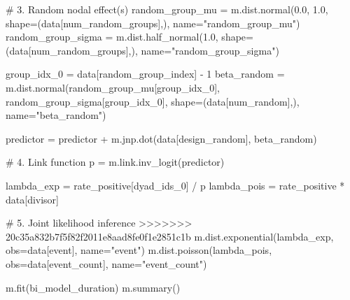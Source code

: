 \documentclass[
  letterpaper,
  DIV=11,
  numbers=noendperiod]{scrartcl}
\newenvironment{Shaded}{\begin{snugshade}}{\end{snugshade}}
\newcommand{\CommentTok}[1]{\textcolor[rgb]{0.37,0.37,0.37}{#1}}
\newcommand{\DecValTok}[1]{\textcolor[rgb]{0.68,0.00,0.00}{#1}}
\newcommand{\ErrorTok}[1]{\textcolor[rgb]{0.68,0.00,0.00}{#1}}
\newcommand{\FloatTok}[1]{\textcolor[rgb]{0.68,0.00,0.00}{#1}}
\newcommand{\NormalTok}[1]{\textcolor[rgb]{0.00,0.23,0.31}{#1}}
\newcommand{\OperatorTok}[1]{\textcolor[rgb]{0.37,0.37,0.37}{#1}}
\newcommand{\StringTok}[1]{\textcolor[rgb]{0.13,0.47,0.30}{#1}}
\begin{document}
\begin{Shaded}
\begin{Highlighting}[]
    \CommentTok{\# 3. Random nodal effect(s)}
\NormalTok{    random\_group\_mu }\OperatorTok{=}\NormalTok{ m.dist.normal(}\FloatTok{0.0}\NormalTok{, }\FloatTok{1.0}\NormalTok{, shape}\OperatorTok{=}\NormalTok{(data[}\StringTok{\textquotesingle{}num\_random\_groups\textquotesingle{}}\NormalTok{],), name}\OperatorTok{=}\StringTok{"random\_group\_mu"}\NormalTok{)}
\NormalTok{    random\_group\_sigma }\OperatorTok{=}\NormalTok{ m.dist.half\_normal(}\FloatTok{1.0}\NormalTok{, shape}\OperatorTok{=}\NormalTok{(data[}\StringTok{\textquotesingle{}num\_random\_groups\textquotesingle{}}\NormalTok{],), name}\OperatorTok{=}\StringTok{"random\_group\_sigma"}\NormalTok{)}
    
\NormalTok{    group\_idx\_0 }\OperatorTok{=}\NormalTok{ data[}\StringTok{\textquotesingle{}random\_group\_index\textquotesingle{}}\NormalTok{] }\OperatorTok{{-}} \DecValTok{1}
\NormalTok{    beta\_random }\OperatorTok{=}\NormalTok{ m.dist.normal(random\_group\_mu[group\_idx\_0], random\_group\_sigma[group\_idx\_0], shape}\OperatorTok{=}\NormalTok{(data[}\StringTok{\textquotesingle{}num\_random\textquotesingle{}}\NormalTok{],), name}\OperatorTok{=}\StringTok{"beta\_random"}\NormalTok{)}
    
\NormalTok{    predictor }\OperatorTok{=}\NormalTok{ predictor }\OperatorTok{+}\NormalTok{ m.jnp.dot(data[}\StringTok{\textquotesingle{}design\_random\textquotesingle{}}\NormalTok{], beta\_random)}

    \CommentTok{\# 4. Link function}
\NormalTok{    p }\OperatorTok{=}\NormalTok{ m.link.inv\_logit(predictor)}
    
\NormalTok{    lambda\_exp }\OperatorTok{=}\NormalTok{ rate\_positive[dyad\_ids\_0] }\OperatorTok{/}\NormalTok{ p}
\NormalTok{    lambda\_pois }\OperatorTok{=}\NormalTok{ rate\_positive }\OperatorTok{*}\NormalTok{ data[}\StringTok{\textquotesingle{}divisor\textquotesingle{}}\NormalTok{]}
    
    \CommentTok{\# 5. Joint likelihood inference}
\OperatorTok{\textgreater{}\textgreater{}\textgreater{}\textgreater{}\textgreater{}\textgreater{}\textgreater{}} \DecValTok{20}\ErrorTok{c35a832b7f5f82f2011e8aad8fe0f1e2851c1b}
\NormalTok{    m.dist.exponential(lambda\_exp, obs}\OperatorTok{=}\NormalTok{data[}\StringTok{\textquotesingle{}event\textquotesingle{}}\NormalTok{], name}\OperatorTok{=}\StringTok{"event"}\NormalTok{)}
\NormalTok{    m.dist.poisson(lambda\_pois, obs}\OperatorTok{=}\NormalTok{data[}\StringTok{\textquotesingle{}event\_count\textquotesingle{}}\NormalTok{], name}\OperatorTok{=}\StringTok{"event\_count"}\NormalTok{)}

\NormalTok{m.fit(bi\_model\_duration)}
\NormalTok{m.summary()}
\end{Highlighting}
\end{Shaded}
\end{document}
